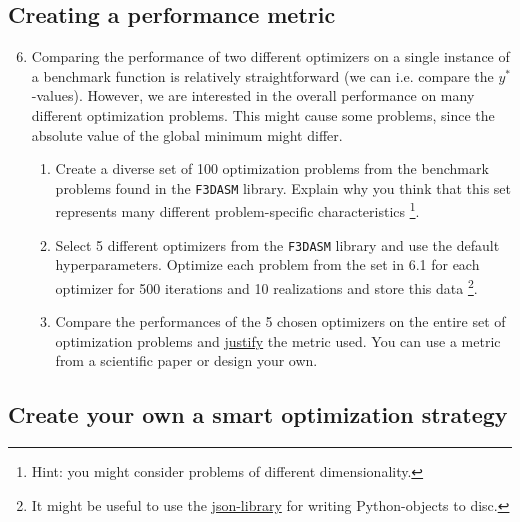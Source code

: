 \documentclass[10pt,a4paper,twoside]{article} %
\def\code#1{\texttt{#1}}
\begin{document}
\subsection*{Creating a performance metric}

\begin{enumerate}
    \setcounter{enumi}{5}
    \item Comparing the performance of two different optimizers on a single instance of a benchmark function is relatively straightforward (we can i.e. compare the $y^*$-values). However, we are interested in the overall performance on many different optimization problems. This might cause some problems, since the absolute value of the global minimum might differ.
    
    \begin{enumerate} [label*=\arabic*.]
        \item Create a diverse set of 100 optimization problems from the benchmark problems found in the \code{F3DASM} library. Explain why you think that this set represents many different problem-specific characteristics \footnote{Hint: you might consider problems of different dimensionality.}.
        
        \item Select 5 different optimizers from the \code{F3DASM} library and use the default hyperparameters. Optimize each problem from the set in 6.1 for each optimizer for 500 iterations and 10 realizations and store this data \footnote{It might be useful to use the \href{https://docs.python.org/3/library/json.html}{json-library} for writing Python-objects to disc. }.
        
        \item Compare the performances of the 5 chosen optimizers on the entire set of optimization problems and \underline{justify} the metric used. You can use a metric from a scientific paper or design your own.
        
    \end{enumerate}
    
\end{enumerate}

\subsection*{Create your own a smart optimization strategy}
\end{document}
